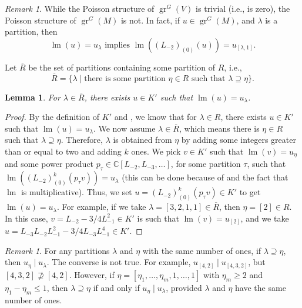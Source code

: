 \documentclass[a4paper, 12pt, reqno]{amsart}
\newtheorem{lemma}[theorem]{Lemma}
\theoremstyle{remark}
\newtheorem{remark}[theorem]{Remark}
\DeclareMathOperator{\gr}{gr}
\DeclareMathOperator{\lm}{lm}
\begin{document}
\begin{remark}
  \label{rmk:8}
  While the Poisson structure of $\gr^G(V)$ is trivial (i.e., is zero), the Poisson structure of $\gr^G(M)$ is not.
  In fact, if $u \in \gr^G(M)$, and $\lambda$ is a partition, then
  \begin{equation*}
    \lm(u) = u_{\lambda}\text{ implies }\lm((L_{-2})_{(0)}(u)) = u_{[\lambda, 1]}.
  \end{equation*}
\end{remark}

Let $\overline{R}$ be the set of partitions containing some partition of $R$, i.e.,
\begin{equation*}
  \overline{R} = \{\lambda \mid \text{there is some partition $\eta \in R$ such that $\lambda \supseteq \eta$}\}.
\end{equation*}

\begin{lemma}
  \label{lmm:10}
  For $\lambda \in \overline{R}$, there exists $u \in K'$ such that $\lm(u) = u_{\lambda}$.
\end{lemma}

\begin{proof}
  By the definition of $K'$ and \cite[Proposition 5.1]{andrews_singular_2022}, we know that for $\lambda \in R$, there exists $u \in K'$ such that $\lm(u) = u_{\lambda}$.
  We now assume $\lambda \in \overline{R}$, which means there is $\eta \in R$ such that $\lambda \supseteq \eta$.
  Therefore, $\lambda$ is obtained from $\eta$ by adding some integers greater than or equal to two and adding $k$ ones.
  We pick $v \in K'$ such that $\lm(v) = u_{\eta}$ and some power product $p_{\tau} \in \mathbb{C}[L_{-2}, L_{-3}, \dots]$, for some partition $\tau$, such that $\lm((L_{-2})^k_{(0)}(p_{\tau}v)) = u_{\lambda}$ (this can be done because of  and the fact that $\lm$ is multiplicative).
  Thus, we set $u = (L_{-2})^k_{(0)}(p_{\tau}v) \in K'$ to get $\lm(u) = u_{\lambda}$.
  For example, if we take $\lambda = [3, 2, 1, 1] \in \overline{R}$, then $\eta = [2] \in R$.
  In this case, $v = L_{-2}- 3/4L_{-1}^2 \in K'$ is such that $\lm(v) = u_{[2]}$, and we take $u = L_{-3}L_{-2}L_{-1}^2 - 3/4L_{-3}L_{-1}^4 \in K'$.
\end{proof}

\begin{remark}
  \label{rmk:9}
  For any partitions $\lambda$ and $\eta$ with the same number of ones, if $\lambda \supseteq \eta$, then $u_{\eta} \mid u_{\lambda}$.
  The converse is not true.
  For example, $u_{[4, 2]} \mid u_{[4, 3, 2]}$, but $[4, 3, 2] \nsupseteq [4, 2]$.
  However, if $\eta = [\eta_1, \dots, \eta_m, 1, \dots, 1]$ with $\eta_m \ge 2$ and $\eta_1 - \eta_m \le 1$, then $\lambda \supseteq \eta$ if and only if $u_{\eta} \mid u_{\lambda}$, provided $\lambda$ and $\eta$ have the same number of ones.
\end{remark}
\end{document}
